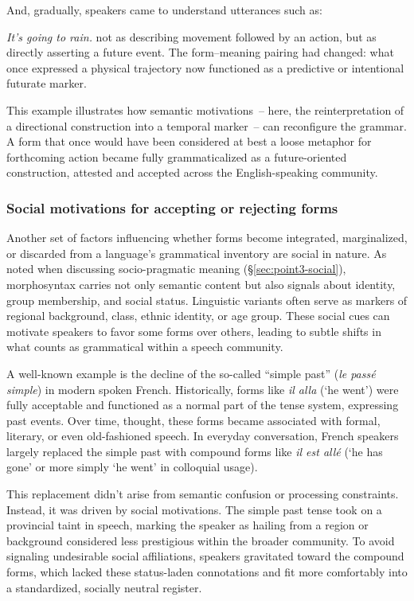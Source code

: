 \documentclass[12pt,letterpaper]{article}
\begin{document}
\ea
    \z
\z
And, gradually, speakers came to understand utterances such as:

\ea
\textit{It's going to rain.}
\z
not as describing movement followed by an action, but as directly asserting a future event. The form--meaning pairing had changed: what once expressed a physical trajectory now functioned as a predictive or intentional futurate marker.

This example illustrates how semantic motivations~-- here, the reinterpretation of a directional construction into a temporal marker~-- can reconfigure the grammar. A form that once would have been considered at best a loose metaphor for forthcoming action became fully grammaticalized as a future-oriented construction, attested and accepted across the English-speaking community.

\subsubsection{Social motivations for accepting or rejecting forms}\label{subsec:social-motivations}

Another set of factors influencing whether forms become integrated, marginalized, or discarded from a language’s grammatical inventory are social in nature. As noted when discussing socio-pragmatic meaning (\S\ref{sec:point3-social}), morphosyntax carries not only semantic content but also signals about identity, group membership, and social status. Linguistic variants often serve as markers of regional background, class, ethnic identity, or age group. These social cues can motivate speakers to favor some forms over others, leading to subtle shifts in what counts as grammatical within a speech community.

A well-known example is the decline of the so-called “simple past” (\textit{le passé simple}) in modern spoken French. Historically, forms like \textit{il alla} (‘he went’) were fully acceptable and functioned as a normal part of the tense system, expressing past events. Over time, thought, these forms became associated with formal, literary, or even old-fashioned speech. In everyday conversation, French speakers largely replaced the simple past with compound forms like \textit{il est allé} (‘he has gone’ or more simply ‘he went’ in colloquial usage).

This replacement didn't arise from semantic confusion or processing constraints. Instead, it was driven by social motivations. The simple past tense took on a provincial taint in speech, marking the speaker as hailing from a region or background considered less prestigious within the broader community. To avoid signaling undesirable social affiliations, speakers gravitated toward the compound forms, which lacked these status-laden connotations and fit more comfortably into a standardized, socially neutral register.
\end{document}
